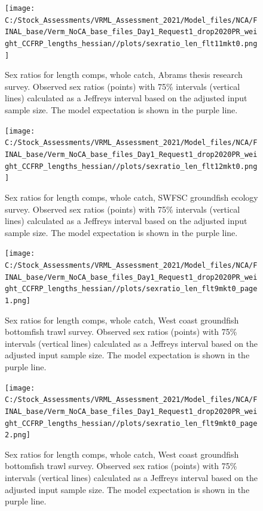 \documentclass[11pt,
  english,
]{article}
\begin{document}
\FloatBarrier

\begin{figure}
\centering
\texttt{[image: C:/Stock\_Assessments/VRML\_Assessment\_2021/Model\_files/NCA/FINAL\_base/Verm\_NoCA\_base\_files\_Day1\_Request1\_drop2020PR\_weight\_CCFRP\_lengths\_hessian//plots/sexratio\_len\_flt11mkt0.png]}
\caption{Sex ratios for length comps, whole catch, Abrams thesis research survey. Observed sex ratios (points) with 75\% intervals (vertical lines) calculated as a Jeffreys interval based on the adjusted input sample size. The model expectation is shown in the purple line.\label{fig:sexratio-ABRAMS-RESEARCH-1}}
\end{figure}

\begin{figure}
\centering
\texttt{[image: C:/Stock\_Assessments/VRML\_Assessment\_2021/Model\_files/NCA/FINAL\_base/Verm\_NoCA\_base\_files\_Day1\_Request1\_drop2020PR\_weight\_CCFRP\_lengths\_hessian//plots/sexratio\_len\_flt12mkt0.png]}
\caption{Sex ratios for length comps, whole catch, SWFSC groundfish ecology survey. Observed sex ratios (points) with 75\% intervals (vertical lines) calculated as a Jeffreys interval based on the adjusted input sample size. The model expectation is shown in the purple line.\label{fig:sexratio-SWFSC-GF-ECOL-2}}
\end{figure}

\begin{figure}
\centering
\texttt{[image: C:/Stock\_Assessments/VRML\_Assessment\_2021/Model\_files/NCA/FINAL\_base/Verm\_NoCA\_base\_files\_Day1\_Request1\_drop2020PR\_weight\_CCFRP\_lengths\_hessian//plots/sexratio\_len\_flt9mkt0\_page1.png]}
\caption{Sex ratios for length comps, whole catch, West coast groundfish bottomfish trawl survey. Observed sex ratios (points) with 75\% intervals (vertical lines) calculated as a Jeffreys interval based on the adjusted input sample size. The model expectation is shown in the purple line.\label{fig:sexratio-NWFSC-TWL-3}}
\end{figure}

\begin{figure}
\centering
\texttt{[image: C:/Stock\_Assessments/VRML\_Assessment\_2021/Model\_files/NCA/FINAL\_base/Verm\_NoCA\_base\_files\_Day1\_Request1\_drop2020PR\_weight\_CCFRP\_lengths\_hessian//plots/sexratio\_len\_flt9mkt0\_page2.png]}
\caption{Sex ratios for length comps, whole catch, West coast groundfish bottomfish trawl survey. Observed sex ratios (points) with 75\% intervals (vertical lines) calculated as a Jeffreys interval based on the adjusted input sample size. The model expectation is shown in the purple line.\label{fig:sexratio-NWFSC-TWL-4}}
\end{figure}
\end{document}
